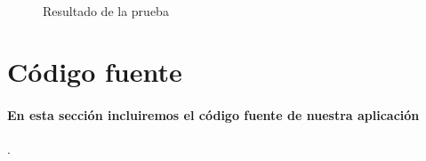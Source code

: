 \documentclass [12pt, a4paper]{article}
\begin{document}
	\begin{figure}[h]
	\centering
	\\
	\caption{Resultado de la prueba}
	\label{result5}
\end{figure}
	\clearpage
	\section{Código fuente}
	\paragraph{En esta sección incluiremos el código fuente de nuestra aplicación}
	{. }
	
	
	
	
	
\end{document}
